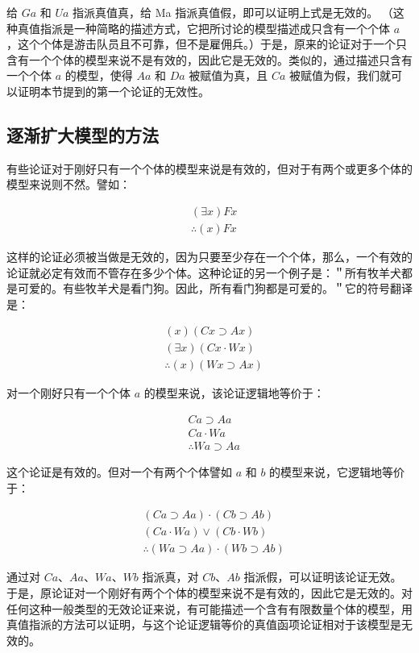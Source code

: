 给 $G a$ 和 $U a$ 指派真值真，给 Ma 指派真值假，即可以证明上式是无效的。 （这种真值指派是一种简略的描述方式，它把所讨论的模型描述成只含有一个个体 $a$ ，这个个体是游击队员且不可靠，但不是雇佣兵。）于是，原来的论证对于一个只含有一个个体的模型来说不是有效的，因此它是无效的。类似的，通过描述只含有一个个体 $a$ 的模型，使得 $A a$ 和 $D a$ 被赋值为真，且 $C a$ 被赋值为假，我们就可以证明本节提到的第一个论证的无效性。\cite{tarski1954}

\subsection{逐渐扩大模型的方法}

有些论证对于刚好只有一个个体的模型来说是有效的，但对于有两个或更多个体的模型来说则不然。譬如：

$$
\begin{aligned}
& (\exists x) F x \\
& \therefore(x) F x
\end{aligned}
$$

这样的论证必须被当做是无效的，因为只要至少存在一个个体，那么，一个有效的论证就必定有效而不管存在多少个体。这种论证的另一个例子是：＂所有牧羊犬都是可爱的。有些牧羊犬是看门狗。因此，所有看门狗都是可爱的。＂它的符号翻译是：

$$
\begin{aligned}
& (x)(C x \supset A x) \\
& (\exists x)(C x \cdot W x) \\
& \therefore(x)(W x \supset A x)
\end{aligned}
$$

对一个刚好只有一个个体 $a$ 的模型来说，该论证逻辑地等价于：

$$
\begin{aligned}
& C a \supset A a \\
& C a \cdot W a \\
& \therefore W a \supset A a
\end{aligned}
$$

这个论证是有效的。但对一个有两个个体譬如 $a$ 和 $b$ 的模型来说，它逻辑地等价于：

$$
\begin{aligned}
& (C a \supset A a) \cdot(C b \supset A b) \\
& (C a \cdot W a) \vee(C b \cdot W b) \\
& \therefore(W a \supset A a) \cdot(W b \supset A b)
\end{aligned}
$$

通过对 $C a 、 A a 、 W a 、 W b$ 指派真，对 $C b 、 A b$ 指派假，可以证明该论证无效。于是，原论证对一个刚好有两个个体的模型来说不是有效的，因此它是无效的。对任何这种一般类型的无效论证来说，有可能描述一个含有有限数量个体的模型，用真值指派的方法可以证明，与这个论证逻辑等价的真值函项论证相对于该模型是无效的。

